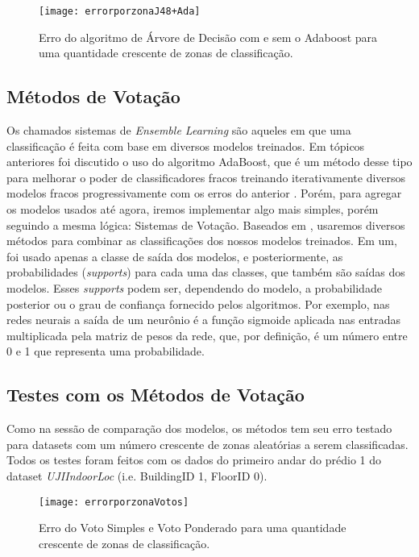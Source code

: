\begin{figure}
	\centering
	\caption{Erro do algoritmo de Árvore de Decisão com e sem o Adaboost  para uma quantidade crescente de zonas de classificação.}
  \texttt{[image: errorporzonaJ48+Ada]}
\label{fig:zonaAda}

\end{figure}

\clearpage


\subsection{Métodos de Votação}

Os chamados sistemas de \textit{Ensemble Learning} são aqueles em que uma classificação é feita com base em diversos modelos treinados. Em tópicos anteriores foi discutido o uso do algoritmo AdaBoost, que é um método desse tipo para melhorar o poder de classificadores fracos treinando iterativamente diversos modelos fracos progressivamente com os erros do anterior \cite {explainingadaboost}. Porém, para agregar os modelos usados até agora, iremos implementar algo mais simples, porém seguindo a mesma lógica: Sistemas de Votação. Baseados em \cite{Nagi2013}, usaremos diversos métodos para combinar as classificações dos nossos modelos treinados. Em um, foi usado apenas a classe de saída dos modelos, e posteriormente, as probabilidades (\textit{supports}) para cada uma das classes, que também são saídas dos modelos. Esses \textit{supports} podem ser, dependendo do modelo, a probabilidade posterior ou o grau de confiança fornecido pelos algoritmos. Por exemplo, nas redes neurais a saída de um neurônio é a função sigmoide aplicada nas entradas multiplicada pela matriz de pesos da rede, que, por definição, é um número entre 0 e 1 que representa uma probabilidade.




\subsection{Testes com os Métodos de Votação}

Como na sessão de comparação dos modelos, os métodos tem seu erro testado para datasets com um número crescente de zonas aleatórias a serem classificadas. Todos os testes foram feitos com os dados do primeiro andar do prédio 1 do dataset \textit{UJIIndoorLoc} (i.e. BuildingID 1, FloorID 0).




\begin{figure}[!ht]
	\centering
	\caption{Erro do Voto Simples e Voto Ponderado para uma quantidade crescente de zonas de classificação.}
  \texttt{[image: errorporzonaVotos]}
\label{fig:zonaVotos}

\end{figure}
